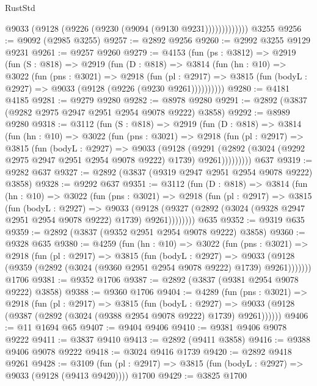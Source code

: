 \begin{lexlean}{RustStd}
\begin{coremodule}
                  @9033 (@9128 (@9226 (@9230 (@9094 (@9130 @9231)))))))))))))
    @3255
@9256 := @9092 (@2985 @3255)
@9257 := @2892 @9256
@9260 := @2992 @3255 @9129 @9231
@9261 := @9257 @9260
@9279 := @4153
    (fun (ps : @3812) =>
    @2919
      (fun (S : @818) =>
      @2919
        (fun (D : @818) =>
        @3814
          (fun (hn : @10) =>
          @3022
            (fun (pns : @3021) =>
            @2918
              (fun (pl : @2917) =>
              @3815 (fun (bodyL : @2927) => @9033 (@9128 (@9226 (@9230 @9261))))))))))
@9280 := @4181 @4185
@9281 := @9279 @9280
@9282 := @8978 @9280
@9291 := @2892 (@3837 (@9282 @2975 @2947 @2951 @2954 @9078 @9222) @3858)
@9292 := @8989 @9280
@9318 := @3112
    (fun (S : @818) =>
    @2919
      (fun (D : @818) =>
      @3814
        (fun (hn : @10) =>
        @3022
          (fun (pns : @3021) =>
          @2918
            (fun (pl : @2917) =>
            @3815
              (fun (bodyL : @2927) =>
              @9033
                (@9128
                  (@9291
                    (@2892 (@3024 (@9292 @2975 @2947 @2951 @2954 @9078 @9222) @1739) @9261)))))))))
    @637
@9319 := @9282 @637
@9327 := @2892 (@3837 (@9319 @2947 @2951 @2954 @9078 @9222) @3858)
@9328 := @9292 @637
@9351 := @3112
    (fun (D : @818) =>
    @3814
      (fun (hn : @10) =>
      @3022
        (fun (pns : @3021) =>
        @2918
          (fun (pl : @2917) =>
          @3815
            (fun (bodyL : @2927) =>
            @9033
              (@9128 (@9327 (@2892 (@3024 (@9328 @2947 @2951 @2954 @9078 @9222) @1739) @9261))))))))
    @635
@9352 := @9319 @635
@9359 := @2892 (@3837 (@9352 @2951 @2954 @9078 @9222) @3858)
@9360 := @9328 @635
@9380 := @4259
    (fun (hn : @10) =>
    @3022
      (fun (pns : @3021) =>
      @2918
        (fun (pl : @2917) =>
        @3815
          (fun (bodyL : @2927) =>
          @9033 (@9128 (@9359 (@2892 (@3024 (@9360 @2951 @2954 @9078 @9222) @1739) @9261)))))))
    @1706
@9381 := @9352 @1706
@9387 := @2892 (@3837 (@9381 @2954 @9078 @9222) @3858)
@9388 := @9360 @1706
@9404 := @4289
    (fun (pns : @3021) =>
    @2918
      (fun (pl : @2917) =>
      @3815
        (fun (bodyL : @2927) =>
        @9033 (@9128 (@9387 (@2892 (@3024 (@9388 @2954 @9078 @9222) @1739) @9261))))))
@9406 := @11 @1694 @65
@9407 := @9404 @9406
@9410 := @9381 @9406 @9078 @9222
@9411 := @3837 @9410
@9413 := @2892 (@9411 @3858)
@9416 := @9388 @9406 @9078 @9222
@9418 := @3024 @9416 @1739
@9420 := @2892 @9418 @9261
@9428 := @3109
    (fun (pl : @2917) => @3815 (fun (bodyL : @2927) => @9033 (@9128 (@9413 @9420))))
    @1700
@9429 := @3825 @1700

\end{coremodule}
\end{lexlean}
